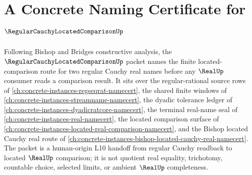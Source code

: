 \chapter{A Concrete Naming Certificate for $\RegularCauchyLocatedComparisonUp$}
\label{ch:concrete-instances-regular-cauchy-located-comparison-namecert}

Following Bishop and Bridges constructive analysis, the $\RegularCauchyLocatedComparisonUp$ packet names the finite located-comparison route for two regular Cauchy real names before any $\RealUp$ consumer reads a comparison result. It sits over the regular-rational source rows of \autoref{ch:concrete-instances-regseqrat-namecert}, the shared finite windows of \autoref{ch:concrete-instances-streamname-namecert}, the dyadic tolerance ledger of \autoref{ch:concrete-instances-dyadicratcore-namecert}, the terminal real-name seal of \autoref{ch:concrete-instances-real-namecert}, the located comparison surface of \autoref{ch:concrete-instances-located-real-comparison-namecert}, and the Bishop located Cauchy real route of \autoref{ch:concrete-instances-bishop-located-cauchy-real-namecert}. The packet is a human-origin L10 handoff from regular Cauchy readback to located $\RealUp$ comparison; it is not quotient real equality, trichotomy, countable choice, selected limits, or ambient $\RealUp$ completeness.

